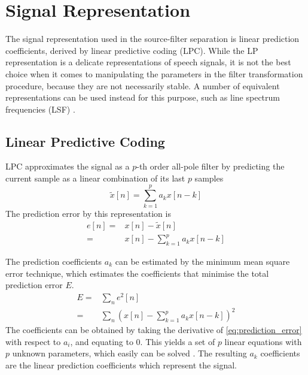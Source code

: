 \section{Signal Representation} %
\label{the:signal_representation}
The signal representation used in the source-filter separation is linear prediction coefficients, derived by linear predictive coding (LPC). While the LP representation is a delicate representations of speech signals, it is not the best choice when it comes to manipulating the parameters in the filter transformation procedure, because they are not necessarily stable. A number of equivalent representations can be used instead for this purpose, such as line spectrum frequencies (LSF) \cite{taletek}.

\subsection{Linear Predictive Coding} %
\label{sub:lpc}
LPC approximates the signal as a $p$-th order all-pole filter by predicting the current sample as a linear combination of its last $p$ samples \cite{digsig}
\begin{equation}
	\tilde{x}[n] = \sum_{k=1}^{p}a_k x[n-k]
\end{equation}
The prediction error by this representation is 
\begin{equation}
	\begin{split}
		e[n]= & x[n]-\tilde{x}[n]\\
		= & x[n]-\sum_{k=1}^{p}a_k x[n-k]
	\end{split}
\end{equation}

The prediction coefficients $a_k$ can be estimated by the minimum mean square error technique, which estimates the coefficients that minimise the total prediction error $E$.
\begin{equation}
	\label{eq:prediction_error}
	\begin{split}
		E = & \sum_{n}e^2[n]\\
		= & \sum_{n}\left( x[n]-\sum_{k=1}^{p}a_k x[n-k] \right)^2
	\end{split}
\end{equation}
The coefficients can be obtained by taking the derivative of \eqref{eq:prediction_error} with respect to $a_i$, and equating to 0. This yields a set of $p$ linear equations with $p$ unknown parameters, which easily can be solved \cite{digsig}. The resulting $a_k$ coefficients are the linear prediction coefficients which represent the signal.


